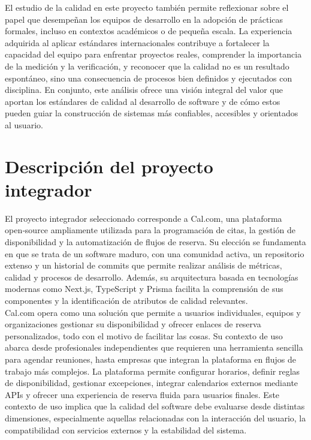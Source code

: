 \documentclass{article}
\begin{document}
El estudio de la calidad en este proyecto también permite reflexionar sobre el papel que desempeñan los equipos de desarrollo en la adopción de prácticas formales, incluso en contextos académicos o de pequeña escala. La experiencia adquirida al aplicar estándares internacionales contribuye a fortalecer la capacidad del equipo para enfrentar proyectos reales, comprender la importancia de la medición y la verificación, y reconocer que la calidad no es un resultado espontáneo, sino una consecuencia de procesos bien definidos y ejecutados con disciplina. En conjunto, este análisis ofrece una visión integral del valor que aportan los estándares de calidad al desarrollo de software y de cómo estos pueden guiar la construcción de sistemas más confiables, accesibles y orientados al usuario.

\newpage
\section{Descripción del proyecto integrador}
El proyecto integrador seleccionado corresponde a Cal.com, una plataforma open‑source ampliamente utilizada para la programación de citas, la gestión de disponibilidad y la automatización de flujos de reserva. Su elección se fundamenta en que se trata de un software maduro, con una comunidad activa, un repositorio extenso y un historial de commits que permite realizar análisis de métricas, calidad y procesos de desarrollo. Además, su arquitectura basada en tecnologías modernas como Next.js, TypeScript y Prisma facilita la comprensión de sus componentes y la identificación de atributos de calidad relevantes.\\

Cal.com opera como una solución que permite a usuarios individuales, equipos y organizaciones gestionar su disponibilidad y ofrecer enlaces de reserva personalizados, todo con el motivo de facilitar las cosas. Su contexto de uso abarca desde profesionales independientes que requieren una herramienta sencilla para agendar reuniones, hasta empresas que integran la plataforma en flujos de trabajo más complejos. La plataforma permite configurar horarios, definir reglas de disponibilidad, gestionar excepciones, integrar calendarios externos mediante APIs y ofrecer una experiencia de reserva fluida para usuarios finales. Este contexto de uso implica que la calidad del software debe evaluarse desde distintas dimensiones, especialmente aquellas relacionadas con la interacción del usuario, la compatibilidad con servicios externos y la estabilidad del sistema.\\
\end{document}
